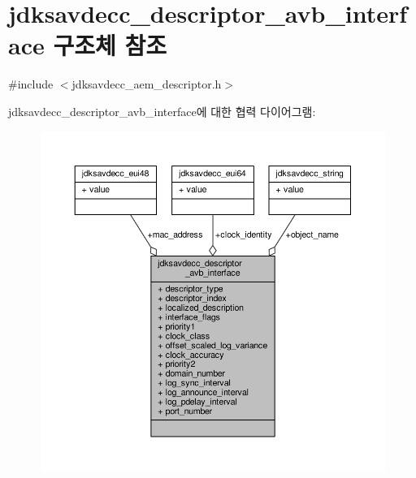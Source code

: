 \hypertarget{structjdksavdecc__descriptor__avb__interface}{}\section{jdksavdecc\+\_\+descriptor\+\_\+avb\+\_\+interface 구조체 참조}
\label{structjdksavdecc__descriptor__avb__interface}


{\ttfamily \#include $<$jdksavdecc\+\_\+aem\+\_\+descriptor.\+h$>$}



jdksavdecc\+\_\+descriptor\+\_\+avb\+\_\+interface에 대한 협력 다이어그램\+:
\nopagebreak
\begin{figure}[H]
\begin{center}
\leavevmode
\includegraphics[width=350pt]{structjdksavdecc__descriptor__avb__interface__coll__graph}
\end{center}
\end{figure}
